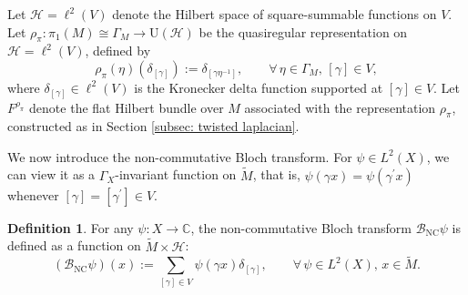 \documentclass[11pt,oneside,reqno]{amsart}
\theoremstyle{definition}
\newtheorem{definition}{Definition}[section]
\newtheorem{remark}[definition]{Remark}
\numberwithin{equation}{section}
\theoremstyle{plain}
\begin{document}

Let $\mathcal{H}=\ell^2(V)$ denote the Hilbert space of square-summable functions on $V$. Let $\rho_{\pi}: \pi_1(M)\cong  \Gamma_{M}\to \mathrm{U}(\mathcal{H})$ be the quasiregular representation on $\mathcal H=\ell^{2}(V)$, defined by
\begin{equation*}
    \rho_{\pi}(\eta)(\delta_{[\gamma]}):=\delta_{[\gamma \eta^{-1} ]}, \qquad \forall \,\eta \in \Gamma_M,\, [\gamma]\in V,
\end{equation*}
where $\delta_{[\gamma]}\in \ell^2(V)$ is the Kronecker delta function supported at $[\gamma] \in V$. Let $F^{\rho_\pi}$ denote the flat Hilbert bundle over $M$ associated with the representation $\rho_\pi$, constructed as in Section \ref{subsec: twisted laplacian}.







We now introduce the non-commutative Bloch transform. For $\psi \in L^2(X)$, we can view it as a $\Gamma_X$-invariant function on $\widetilde{M}$, that is, $\psi(\gamma x)=\psi(\gamma^{\prime}x)$ whenever $[\gamma]=[\gamma^{\prime}] \in V$.

\begin{definition}
For any $\psi :X\rightarrow \mathbb{C}$, the non-commutative Bloch transform $\mathcal{B}_{\mathrm{NC}} \psi$ is defined as a function on $\widetilde{M} \times \mathcal{H}$:
\begin{equation}\label{defofnonbloch}
(\mathcal{B}_{\mathrm{NC}}\psi)(x):=\sum_{[\gamma]\in V}\psi(\gamma x)\delta_{[\gamma]}, \qquad \forall \,\psi \in L^2(X),\,x\in \widetilde{M} .
\end{equation}
\end{definition}
\end{document}
